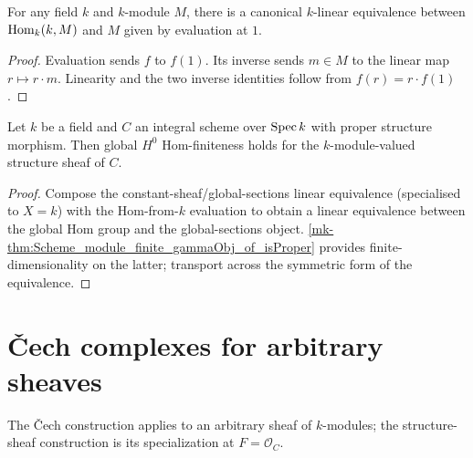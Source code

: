 \begin{theorem}\label{mk-def:Scheme_homFromOne_linearEquiv}
  \leanok

  For any field \(k\) and \(k\)-module \(M\), there is a canonical \(k\)-linear equivalence between \(\operatorname{Hom}_k(k, M)\) and \(M\) given by evaluation at \(1\).
\end{theorem}

\begin{proof}
  \leanok
  Evaluation sends \(f\) to \(f(1)\). Its inverse sends \(m\in M\) to the linear map \(r\mapsto r\cdot m\). Linearity and the two inverse identities follow from \(f(r)=r\cdot f(1)\).
\end{proof}

\begin{theorem}\label{mk-inst:Scheme_instIsHModuleHomFinite_toModuleKSheaf}
  \leanok

  Let \(k\) be a field and \(C\) an integral scheme over \(\operatorname{Spec} k\) with proper structure morphism. Then global \(H^0\) Hom-finiteness holds for the \(k\)-module-valued structure sheaf of \(C\).
\end{theorem}

\begin{proof}
  \leanok

  Compose the constant-sheaf/global-sections linear equivalence (specialised to \(X = k\)) with the Hom-from-\(k\) evaluation to obtain a linear equivalence between the global Hom group and the global-sections object. \ref{mk-thm:Scheme_module_finite_gammaObj_of_isProper} provides finite-dimensionality on the latter; transport across the symmetric form of the equivalence.
\end{proof}

\section{\v{C}ech complexes for arbitrary sheaves}
\label{mk-sec:moduleK_cech_parameterised}

The \v{C}ech construction applies to an arbitrary sheaf of \(k\)-modules; the structure-sheaf construction is its specialization at \(F=\mathcal O_C\).

